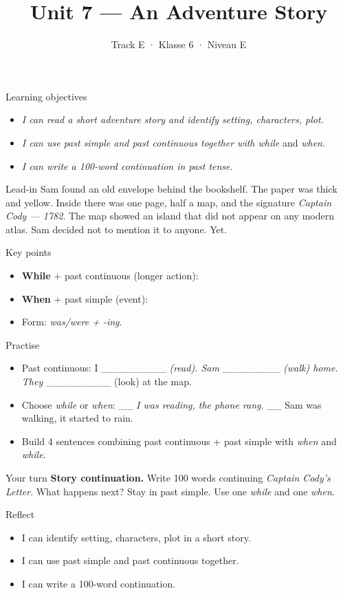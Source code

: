 \documentclass[aspectratio=169,11pt]{beamer}
\title{Unit 7 — An Adventure Story}
\subtitle{Track E · Klasse 6 · Niveau E}
\begin{document}
\begin{frame}[plain]\titlepage\end{frame}
\begin{frame}{Learning objectives}
\begin{itemize}
  \item \textit{I can read a short adventure story and identify setting, characters, plot.}
  \item \textit{I can use past simple and past continuous together with while} and \textit{when}.
  \item \textit{I can write a 100-word continuation in past tense.}
\end{itemize}
\end{frame}

\begin{frame}{Lead-in}
\large Sam found an old envelope behind the bookshelf. The paper was thick and yellow. Inside there was one page, half a map, and the signature \textit{Captain Cody — 1782}. The map showed an island that did not appear on any modern atlas. Sam decided not to mention it to anyone. Yet.
\end{frame}

\begin{frame}{Key points}
\small
\begin{itemize}
  \item \textbf{While} + past continuous (longer action):
  \item \textbf{When} + past simple (event):
  \item Form: \textit{was/were + -ing}.
\end{itemize}
\end{frame}

\begin{frame}{Practise}
\small
\begin{itemize}
  \item Past continuous: I \_\_\_\_\_\_\_\_\_\textit{ (read). Sam }\_\_\_\_\_\_\_\_\textit{ (walk) home. They }\_\_\_\_\_\_\_\_\_ (look) at the map.
  \item Choose \textit{while} or \textit{when}: \_\_\textit{ I was reading, the phone rang. }\_\_ Sam was walking, it started to rain.
  \item Build 4 sentences combining past continuous + past simple with \textit{when} and \textit{while}.
\end{itemize}
\end{frame}

\begin{frame}{Your turn}
\large \textbf{Story continuation.} Write 100 words continuing \textit{Captain Cody's Letter}. What happens next? Stay in past simple. Use one \textit{while} and one \textit{when}.
\end{frame}

\begin{frame}{Reflect}
\small
\begin{itemize}
  \item I can identify setting, characters, plot in a short story.
  \item I can use past simple and past continuous together.
  \item I can write a 100-word continuation.
\end{itemize}
\end{frame}
\end{document}
